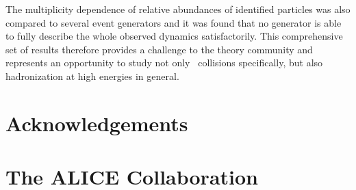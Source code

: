 \documentclass[ALICE,manyauthors]{cernphprep}
\begin{document}

The multiplicity dependence of 
relative abundances of identified particles was also compared to several 
event generators and it was found that no generator is able to fully describe the whole observed dynamics satisfactorily. This comprehensive set of results therefore provides a challenge to 
the theory community and
represents an opportunity to study not only \pp\ collisions specifically, but also hadronization at high energies in general. 



\newenvironment{acknowledgement}{\relax}{\relax}
\begin{acknowledgement}
\section*{Acknowledgements}

\end{acknowledgement}

% 
 	


\newpage
\appendix

\newpage
\section{The ALICE Collaboration}
\label{app:collab}

\end{document}
